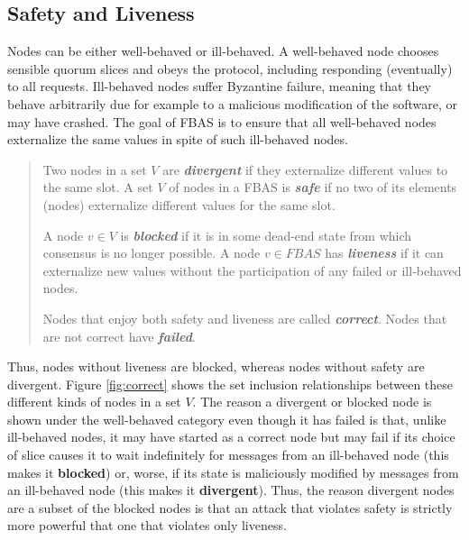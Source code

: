 \subsection{Safety and Liveness}
Nodes can be either well-behaved or ill-behaved. A well-behaved node chooses sensible quorum slices and obeys the protocol, including responding (eventually) to all requests. Ill-behaved nodes suffer Byzantine failure, meaning that they behave arbitrarily due for example to a malicious modification of the software, or may have crashed. The goal of FBAS is to ensure that all well-behaved nodes externalize the same values in spite of such ill-behaved nodes.
\begin{quote}
\vspace{-0.6cm}
\small
\begin{defin}
Two nodes in a set $V$ are \emph{\textbf{divergent}} if they externalize different values to the same slot. A set $V$ of nodes in a FBAS is \emph{\textbf{safe}} if no two of its elements (nodes) externalize different values for the same slot.
\end{defin}
\begin{defin}
A node $v \in V$ is \emph{\textbf{blocked}} if it is in some dead-end state from which consensus is no longer possible. A node $v \in FBAS$ has \emph{\textbf{liveness}} if it can externalize new values without the participation of any failed or ill-behaved nodes.
\end{defin}
\begin{defin}
Nodes that enjoy both safety and liveness are called \emph{\textbf{correct}}. Nodes that are not correct have \emph{\textbf{failed}}.
\end{defin}
\end{quote}
Thus, nodes without liveness are blocked, whereas nodes without safety are divergent. Figure \ref{fig:correct} shows the set inclusion relationships between these different kinds of nodes in a set $V$. The reason a divergent or blocked node is shown under the well-behaved category even though it has failed is that, unlike ill-behaved nodes, it may have started as a correct node but may fail if its choice of slice causes it to wait indefinitely for messages from an ill-behaved node (this makes it {\bf blocked}) or, worse, if its state is maliciously modified by messages from an ill-behaved node (this makes it {\bf divergent}). Thus, the reason divergent nodes are a subset of the blocked nodes is that an attack that violates safety is strictly more powerful that one that violates only liveness.

